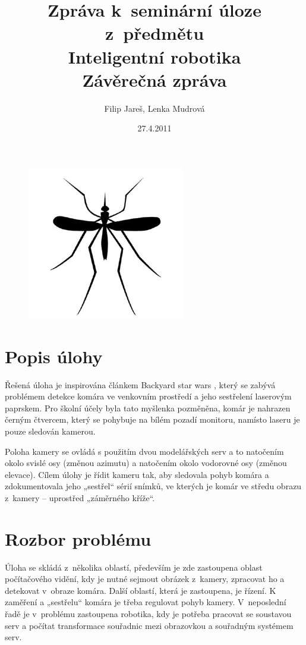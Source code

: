 \documentclass[a4paper,10pt]{article}
\title{Zpráva k~seminární úloze z~předmětu\\ Inteligentní robotika \\ {\small Závěrečná zpráva}}
\author{Filip Jareš, Lenka Mudrová}
\date{27.4.2011}
\begin{document}
\maketitle
\begin{figure}[!h]
	\centering
	\includegraphics[width=0.4\columnwidth]{pics/mosquito}
\end{figure}
\newpage

\section{Popis úlohy}
		Řešená úloha je inspirována článkem Backyard star wars \cite{zadani}, který se zabývá problémem
		detekce komára ve venkovním prostředí a jeho sestřelení laserovým paprskem. 
		Pro školní účely byla tato myšlenka pozměněna, komár je nahrazen černým čtvercem, který se pohybuje na bílém
		pozadí monitoru, namísto laseru je pouze sledován kamerou.

		Poloha kamery se ovládá s použitím dvou modelářských serv a to  
		natočením okolo svislé osy (změnou azimutu) a natočením okolo vodorovné osy (změnou elevace). Cílem úlohy
		je řídit kameru tak, aby sledovala pohyb komára a zdokumentovala jeho „sestřel“
		sérií snímků, ve kterých je komár ve středu obrazu z~kamery – uprostřed
		„záměrného kříže“.

		

\section{Rozbor problému}
		Úloha se skládá z~několika oblastí, především je zde zastoupena oblast
		po\-čí\-ta\-čo\-vé\-ho vidění, kdy je nutné sejmout obrázek z~kamery, zpracovat ho a
		detekovat v~obraze komára. 
		Další oblastí, která je zastoupena, je řízení. K zaměření a „sestřelu“ komára je
		třeba regulovat pohyb kamery.
		V~neposlední řadě je v~problému zastoupena robotika, kdy je potřeba pracovat se
		soustavou serv a počítat transformace souřadnic mezi obrazovkou a souřadným
		systémem serv.
\end{document}
